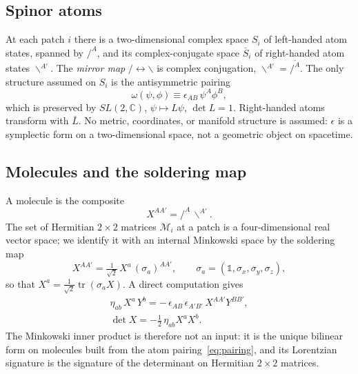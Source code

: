 \documentclass[reprint,aps,prd,amsmath,amssymb,superscriptaddress,nofootinbib,floatfix]{revtex4-2}
\theoremstyle{plain}
\theoremstyle{definition}
\theoremstyle{remark}
\newcommand{\Lat}{\ensuremath{/}}                 %
\newcommand{\Rat}{\ensuremath{\backslash}}        %
\newcommand{\Mol}{\ensuremath{X}}                 %
\newcommand{\tr}{\operatorname{tr}}
\newcommand{\one}{\mathbb{1}}
\newcommand{\SLC}{SL(2,\mathbb{C})}
\begin{document}
\subsection{Spinor atoms}

At each patch $i$ there is a two-dimensional complex space $S_i$ of left-handed atom states, spanned by
$\Lat^A$, and its complex-conjugate space $\bar S_i$ of right-handed atom states $\Rat^{A'}$. The
\emph{mirror map} $\Lat\leftrightarrow\Rat$ is complex conjugation, $\Rat^{A'}=\overline{\Lat^{A}}$. The only
structure assumed on $S_i$ is the antisymmetric pairing
\begin{equation}
\omega(\psi,\phi)\equiv\epsilon_{AB}\,\psi^A\phi^B ,
\label{eq:pairing}
\end{equation}
which is preserved by $\SLC$, $\psi\mapsto L\psi$, $\det L=1$. Right-handed atoms transform with
$\bar L$. No metric, coordinates, or manifold structure is assumed: $\epsilon$ is a symplectic form on a
two-dimensional space, not a geometric object on spacetime.

\subsection{Molecules and the soldering map}

A molecule is the composite
\begin{equation}
\Mol^{AA'}=\Lat^A\,\Rat^{A'} .
\label{eq:molecule}
\end{equation}
The set of Hermitian $2\times2$ matrices $\mathcal{M}_i$ at a patch is a four-dimensional real vector
space; we identify it with an internal Minkowski space by the soldering map
\begin{equation}
\Mol^{AA'}=\tfrac{1}{\sqrt2}\,\Mol^a\,(\sigma_a)^{AA'},\qquad
\sigma_a=(\one,\sigma_x,\sigma_y,\sigma_z),
\label{eq:solder}
\end{equation}
so that $\Mol^a=\tfrac{1}{\sqrt2}\tr(\sigma_a\Mol)$. A direct computation gives
\begin{equation}
\begin{gathered}
\eta_{ab}\,\Mol^a\,Y^b=-\,\epsilon_{AB}\,\epsilon_{A'B'}\,\Mol^{AA'}Y^{BB'},\\
\det \Mol=-\tfrac12\,\eta_{ab}\Mol^a\Mol^b .
\end{gathered}
\label{eq:etaeps}
\end{equation}
The Minkowski inner product is therefore not an input: it is the unique bilinear form on molecules
built from the atom pairing~\eqref{eq:pairing}, and its Lorentzian signature is the signature of the
determinant on Hermitian $2\times2$ matrices.
\end{document}
